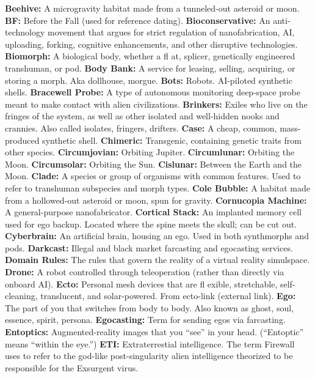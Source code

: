 \textbf{ Beehive:} A microgravity habitat made from a tunneled-out
asteroid or moon.
\textbf{ BF:} Before the Fall (used for reference dating).
\textbf{ Bioconservative:} An anti-technology movement that argues 
for strict regulation of nanofabrication, AI, uploading, forking, 
cognitive enhancements, and other disruptive technologies.
\textbf{ Biomorph:} A biological body, whether a ﬂ at, splicer, 
genetically engineered transhuman, or pod.
\textbf{ Body Bank:} A service for leasing, selling, acquiring, or 
storing a morph. Aka dollhouse, morgue.
\textbf{ Bots:} Robots. AI-piloted synthetic shells.
\textbf{ Bracewell Probe:} A type of autonomous monitoring deep-space
probe meant to make contact with alien civilizations.
\textbf{ Brinkers:} Exiles who live on the fringes of the system, 
as well as other isolated and well-hidden nooks and 
crannies. Also called isolates, fringers, drifters.
\textbf{ Case:} A cheap, common, mass-produced synthetic shell.
\textbf{ Chimeric:} Transgenic, containing genetic traits from 
other species.
\textbf{ Circumjovian:} Orbiting Jupiter.
\textbf{ Circumlunar:} Orbiting the Moon.
\textbf{ Circumsolar:} Orbiting the Sun.
\textbf{ Cislunar:} Between the Earth and the Moon.
\textbf{ Clade:} A species or group of organisms with common 
features. Used to refer to transhuman subspecies and 
morph types. 
\textbf{ Cole Bubble:} A habitat made from a hollowed-out 
asteroid or moon, spun for gravity.
\textbf{ Cornucopia Machine:} A general-purpose nanofabricator.
\textbf{ Cortical Stack:} An implanted memory cell used for ego 
backup. Located where the spine meets the skull; can be 
cut out.
\textbf{ Cyberbrain:} An artificial brain, housing an ego. Used in 
both synthmorphs and pods.
\textbf{ Darkcast:} Illegal and black market farcasting and 
egocasting services.
\textbf{ Domain Rules:} The rules that govern the reality of a 
virtual reality simulspace.
\textbf{ Drone:} A robot controlled through teleoperation (rather 
than directly via onboard AI).
\textbf{ Ecto:} Personal mesh devices that are ﬂ exible, stretchable, 
self-cleaning, translucent, and solar-powered. From 
ecto-link (external link).
\textbf{ Ego:} The part of you that switches from body to body. 
Also known as ghost, soul, essence, spirit, persona.
\textbf{ Egocasting:} Term for sending egos via farcasting.
\textbf{ Entoptics:} Augmented-reality images that you ``see'' in 
your head. (``Entoptic'' means ``within the eye.'')
\textbf{ ETI:} Extraterrestial intelligence. The term Firewall uses 
to refer to the god-like post-singularity alien intelligence 
theorized to be responsible for the Exsurgent virus.
